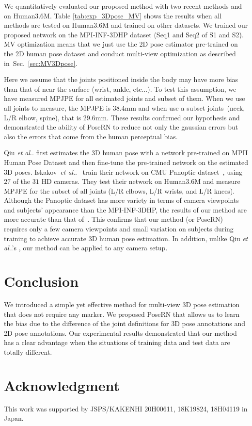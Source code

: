 \documentclass{article}
\makeatletter
\newcommand{\tabref}[1]{{Table \ref{tab:#1}}}
\newcommand{\secref}[1]{Sec.~\ref{sec:#1}}
\DeclareRobustCommand\onedot{\futurelet\@let@token\@onedot}
\def\@onedot{\ifx\@let@token.\else.\null\fi\xspace}
\def\etal{\emph{et al}\onedot}
\makeatother
\begin{document}
We quantitatively evaluated our proposed method with two recent methods \cite{iskakov2019learnable} and \cite{multiviewpose} on Human3.6M. \tabref{exp_3Dpose_MV} shows the results when all methods are tested on Human3.6M and trained on other datasets. We trained our proposed network on the MPI-INF-3DHP dataset \cite{mono-3dhp2017} (Seq1 and Seq2 of S1 and S2). 
MV optimization means that we just use the 2D pose estimator pre-trained on the 2D human pose dataset and conduct multi-view optimization as described in~\secref{MV3Dpose}. 

Here we assume that the joints positioned inside the body may have more bias than that of near the surface (wrist, ankle, etc...). To test this assumption, we have measured MPJPE for all estimated joints and subset of them. When we use all joints to measure, the MPJPE is 38.4mm and when use a subset joints~(neck, L/R elbow, spine), that is 29.6mm. 
These results confirmed our hypothesis and demonstrated the ability of PoseRN to reduce not only the gaussian errors but also the errors that come from the human perceptual bias.

Qiu \etal \cite{multiviewpose} first estimates the 3D human pose with a network pre-trained on MPII Human Pose Dataset \cite{andriluka14cvpr} and then fine-tune the pre-trained network on the estimated 3D poses. Iskakov~\etal~\cite{iskakov2019learnable} train their network on CMU Panoptic dataset~\cite{Joo2017panoptic}, using $27$ of the $31$ HD cameras. They test their network on Human3.6M and measure MPJPE for the subset of all joints (L/R elbows, L/R wrists, and L/R knees). Although the Panoptic dataset has more variety in terms of camera viewpoints and subjects' appearance than the MPI-INF-3DHP, the results of our method are more accurate than that of~\cite{iskakov2019learnable}. This confirms that our method (or PoseRN) requires only a few camera viewpoints and small variation on subjects during training to achieve accurate 3D human pose estimation. In addition, unlike Qiu \etal's \cite{multiviewpose}, our method can be applied to any camera setup. 

\vspace{-0.2cm}
\section{Conclusion}\label{conclusion}
\vspace{-0.2cm}
We introduced a simple yet effective method for multi-view 3D pose estimation that does not require any marker. 
We proposed PoseRN that allows us to learn the bias due to the difference of the joint definitions for 3D pose annotations and 2D pose annotations. 
Our experimental results demonstrated that our method has a clear advantage when the situations of training data and test data are totally different. 

\vspace{-0.4cm}
\section*{\centering \large Acknowledgment}
\vspace{-0.3cm}
This work was supported by JSPS/KAKENHI 20H00611, 18K19824, 18H04119 in Japan.
\vspace{-0.4cm}



\end{document}
